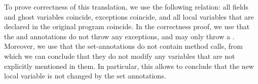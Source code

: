 To prove correctness of this translation, we use the following
relation: all fields and ghost variables coincide, exceptions
coincide, and all local variables that are declared in the original
program coincide. In the correctness proof, we use that the \postset
and \excset annotations do not throw any exceptions, and \preset may only
throw a \JMLExc. Moreover, we use that the set-annotations do not
contain method calls, from which we can conclude that they do not
modify any variables that are not explicitly mentioned in them. In
particular, this allows to conclude that the new local variable is
not changed by the set annotations.

